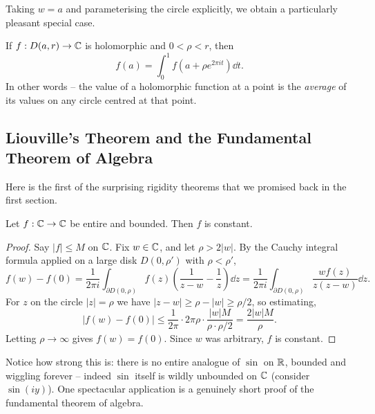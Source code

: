 \documentclass[a4paper]{scrartcl}
\begin{document}
Taking $w = a$ and parameterising the circle explicitly, we obtain a particularly pleasant special case.

\begin{corollary}
    If $f: D(a, r) \rightarrow \mathbb{C}$ is holomorphic and $0 < \rho < r$, then
    $$
    f(a) = \int_0^1 f(a + \rho e^{2 \pi i t}) \dd t.
    $$
    In other words -- the value of a holomorphic function at a point is the \emph{average} of its values on any circle centred at that point.
\end{corollary}

\subsection{Liouville's Theorem and the Fundamental Theorem of Algebra}

Here is the first of the surprising rigidity theorems that we promised back in the first section.

\begin{theorem}
    Let $f: \mathbb{C} \rightarrow \mathbb{C}$ be entire and bounded. Then $f$ is constant.
\end{theorem}
\begin{proof}
    Say $|f| \leq M$ on $\mathbb{C}$. Fix $w \in \mathbb{C}$, and let $\rho > 2|w|$. By the Cauchy integral formula applied on a large disk $D(0, \rho')$ with $\rho < \rho'$,
    $$
    f(w) - f(0) = \frac{1}{2 \pi i} \int_{\partial D(0, \rho)} f(z)\left(\frac{1}{z - w} - \frac{1}{z}\right) \dd z = \frac{1}{2\pi i} \int_{\partial D(0, \rho)} \frac{w f(z)}{z(z - w)} \dd z.
    $$
    For $z$ on the circle $|z| = \rho$ we have $|z - w| \geq \rho - |w| \geq \rho/2$, so estimating,
    $$
    |f(w) - f(0)| \leq \frac{1}{2 \pi} \cdot 2 \pi \rho \cdot \frac{|w| M}{\rho \cdot \rho/2} = \frac{2|w| M}{\rho}.
    $$
    Letting $\rho \rightarrow \infty$ gives $f(w) = f(0)$. Since $w$ was arbitrary, $f$ is constant.
\end{proof}

Notice how strong this is: there is no entire analogue of $\sin$ on $\mathbb{R}$, bounded and wiggling forever -- indeed $\sin$ itself is wildly unbounded on $\mathbb{C}$ (consider $\sin(iy)$). One spectacular application is a genuinely short proof of the fundamental theorem of algebra.
\end{document}
